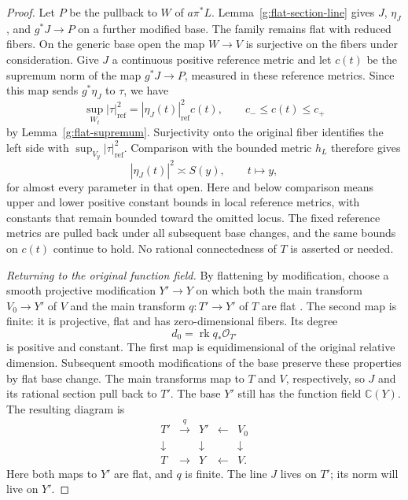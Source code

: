 \begin{proof}
Let \(P\) be the pullback to \(W\) of \(a\pi^*L\).
Lemma~\ref{g:flat-section-line} gives \(J\), \(\eta_J\), and
\(g^*J\to P\) on a further modified base.  The family remains flat with
reduced fibers.  On the generic base open the map \(W\to V\) is
surjective on the fibers under consideration. Give \(J\) a continuous
positive reference metric and let \(c(t)\) be the supremum norm of the
map \(g^*J\to P\), measured in these reference metrics. Since this map
sends \(g^*\eta_J\) to \(\tau\), we have
\[
 \sup_{W_t}|\tau|_{\mathrm{ref}}^2
     =|\eta_J(t)|_{\mathrm{ref}}^2c(t),
 \qquad c_-\leq c(t)\leq c_+
\]
by Lemma~\ref{g:flat-supremum}. Surjectivity onto the original fiber
identifies the left side with \(\sup_{V_y}|\tau|_{\mathrm{ref}}^2\).
Comparison with the bounded metric \(h_L\) therefore gives
\begin{equation}
                  |\eta_J(t)|^2\asymp S(y),\qquad t\mapsto y,
 \label{g:flat-upstairs-comparison}
\end{equation}
for almost every parameter in that open.  Here and below comparison
means upper and lower positive constant bounds in local reference
metrics, with constants that remain bounded toward the omitted locus.
The fixed reference metrics are pulled back under all subsequent base
changes, and the same bounds on \(c(t)\) continue to hold.
No rational connectedness of \(T\) is asserted or needed.

\emph{Returning to the original function field.}
By flattening by modification, choose a smooth projective modification
\(Y'\to Y\) on which both the main transform \(V_0\to Y'\) of \(V\)
and the main transform \(q:T'\to Y'\) of \(T\) are flat
\cite{RaynaudGruson1971}.  The second map is finite: it is projective,
flat and has zero-dimensional fibers.  Its degree
\[
                  d_0=\operatorname{rk}q_*\mathcal O_{T'}
\]
is positive and constant.  The first map is equidimensional of the
original relative dimension.  Subsequent smooth modifications of the
base preserve these properties by flat base change.  The main
transforms map to \(T\) and \(V\), respectively, so \(J\) and its
rational section pull back to \(T'\).  The base \(Y'\) still has the
function field \(\mathbb C(Y)\).
The resulting diagram is
\[
 \begin{array}{ccccc}
 T'&\xrightarrow{\ q\ }&Y'&\longleftarrow&V_0\\
 \downarrow&&\downarrow&&\downarrow\\
 T&\longrightarrow&Y&\longleftarrow&V.
 \end{array}
\]
Here both maps to \(Y'\) are flat, and \(q\) is finite. The line
\(J\) lives on \(T'\); its norm will live on \(Y'\).


\end{proof}
